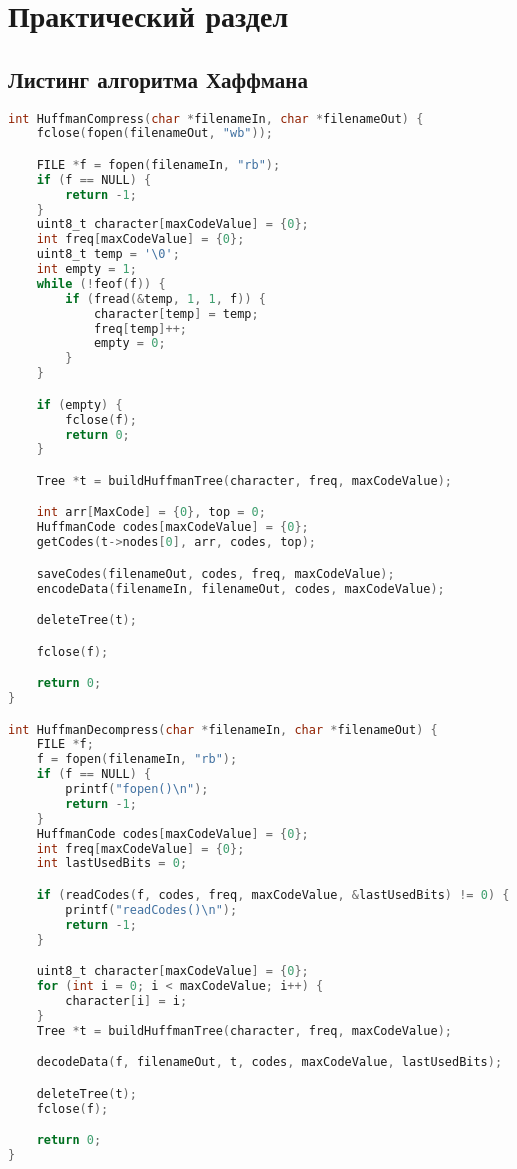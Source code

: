 \chapter{Практический раздел}

\section{Листинг алгоритма Хаффмана}

\begin{lstlisting}[language=C, label=lst:sha1, caption={Реализация алгоритма Хаффмана}]
int HuffmanCompress(char *filenameIn, char *filenameOut) {
    fclose(fopen(filenameOut, "wb"));

    FILE *f = fopen(filenameIn, "rb");
    if (f == NULL) {
        return -1;
    }
    uint8_t character[maxCodeValue] = {0};
    int freq[maxCodeValue] = {0};
    uint8_t temp = '\0';
    int empty = 1;
    while (!feof(f)) {
        if (fread(&temp, 1, 1, f)) {
            character[temp] = temp;
            freq[temp]++;
            empty = 0;
        }
    }

    if (empty) {
        fclose(f);
        return 0;
    }

    Tree *t = buildHuffmanTree(character, freq, maxCodeValue);

    int arr[MaxCode] = {0}, top = 0;
    HuffmanCode codes[maxCodeValue] = {0};
    getCodes(t->nodes[0], arr, codes, top);

    saveCodes(filenameOut, codes, freq, maxCodeValue);
    encodeData(filenameIn, filenameOut, codes, maxCodeValue);

    deleteTree(t);

    fclose(f);

    return 0;
}

int HuffmanDecompress(char *filenameIn, char *filenameOut) {
    FILE *f;
    f = fopen(filenameIn, "rb");
    if (f == NULL) {
        printf("fopen()\n");
        return -1;
    }
    HuffmanCode codes[maxCodeValue] = {0};
    int freq[maxCodeValue] = {0};
    int lastUsedBits = 0;

    if (readCodes(f, codes, freq, maxCodeValue, &lastUsedBits) != 0) {
        printf("readCodes()\n");
        return -1;
    }

    uint8_t character[maxCodeValue] = {0};
    for (int i = 0; i < maxCodeValue; i++) {
        character[i] = i;
    }
    Tree *t = buildHuffmanTree(character, freq, maxCodeValue);

    decodeData(f, filenameOut, t, codes, maxCodeValue, lastUsedBits);

    deleteTree(t);
    fclose(f);

    return 0;
}
\end{lstlisting}


